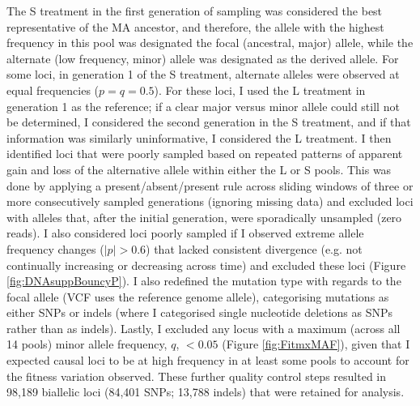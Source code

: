 The S treatment in the first generation of sampling was considered the best representative of the MA ancestor, and therefore, the allele with the highest frequency in this pool was designated the focal (ancestral, major) allele, while the alternate (low frequency, minor) allele was designated as the derived allele. For some loci, in generation 1 of the S treatment, alternate alleles were observed at equal frequencies ($p = q = 0.5$). For these loci, I used the L treatment in generation 1 as the reference; if a clear major versus minor allele could still not be determined, I considered the second generation in the S treatment, and if that information was similarly uninformative, I considered the L treatment. I then identified loci that were poorly sampled based on repeated patterns of apparent gain and loss of the alternative allele within either the L or S pools. This was done by applying a present/absent/present rule across sliding windows of three or more consecutively sampled generations (ignoring missing data) and excluded loci with alleles that, after the initial generation, were sporadically unsampled (zero reads). I also considered loci poorly sampled if I observed extreme allele frequency changes ($|p| >0.6$) that lacked consistent divergence (e.g. not continually increasing or decreasing across time) and excluded these loci (Figure \ref{fig:DNAsuppBouncyP}). I also redefined the mutation type with regards to the focal allele (VCF uses the reference genome allele), categorising mutations as either SNPs or indels (where I categorised single nucleotide deletions as SNPs rather than as indels). Lastly, I excluded any locus with a maximum (across all 14 pools) minor allele frequency, $q$, $< 0.05$ (Figure \ref{fig:FitmxMAF}), given that I expected causal loci to be at high frequency in at least some pools to account for the fitness variation observed. These further quality control steps resulted in 98,189 biallelic loci (84,401 SNPs; 13,788 indels) that were retained for analysis.\par

